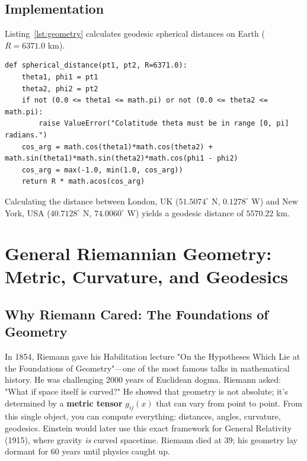 \documentclass[11pt]{amsart}
\theoremstyle{definition}
\begin{document}
\subsection{Implementation}
Listing~\ref{lst:geometry} calculates geodesic spherical distances on Earth ($R = 6371.0$ km).

\begin{lstlisting}[caption={Spherical Riemannian geodesic distance calculation.}, label={lst:geometry}]
def spherical_distance(pt1, pt2, R=6371.0):
    theta1, phi1 = pt1
    theta2, phi2 = pt2
    if not (0.0 <= theta1 <= math.pi) or not (0.0 <= theta2 <= math.pi):
        raise ValueError("Colatitude theta must be in range [0, pi] radians.")
    cos_arg = math.cos(theta1)*math.cos(theta2) + math.sin(theta1)*math.sin(theta2)*math.cos(phi1 - phi2)
    cos_arg = max(-1.0, min(1.0, cos_arg))
    return R * math.acos(cos_arg)
\end{lstlisting}

Calculating the distance between London, UK ($51.5074^\circ$ N, $0.1278^\circ$ W) and New York, USA ($40.7128^\circ$ N, $74.0060^\circ$ W) yields a geodesic distance of $5570.22$ km.

\section{General Riemannian Geometry: Metric, Curvature, and Geodesics}
\label{sec:general_geometry}

\subsection{Why Riemann Cared: The Foundations of Geometry}
In 1854, Riemann gave his Habilitation lecture "On the Hypotheses Which Lie at the Foundations of Geometry"---one of the most famous talks in mathematical history. He was challenging 2000 years of Euclidean dogma. Riemann asked: "What if space itself is curved?" He showed that geometry is not absolute; it's determined by a \textbf{metric tensor} $g_{ij}(x)$ that can vary from point to point. From this single object, you can compute everything: distances, angles, curvature, geodesics. Einstein would later use this exact framework for General Relativity (1915), where gravity \textit{is} curved spacetime. Riemann died at 39; his geometry lay dormant for 60 years until physics caught up.
\end{document}
